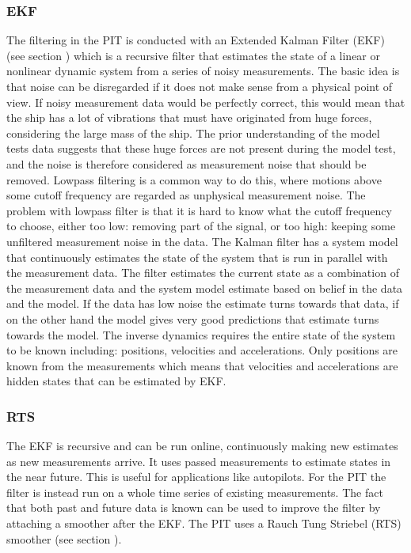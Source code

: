 \documentclass[review]{elsarticle}
\begin{document}
\subsubsection{EKF}
\label{\detokenize{01.01_method:ekf}}
\sphinxAtStartPar
The filtering in the PIT is conducted with an Extended Kalman Filter (EKF) (see section {\hyperref[\detokenize{04.01_EK:ekf}]{}}) which is a recursive filter that estimates the state of a linear or nonlinear dynamic system from a series of noisy measurements. The basic idea is that noise can be disregarded if it does not make sense from a physical point of view. If noisy measurement data would be perfectly correct, this would mean that the ship has a lot of vibrations that must have originated from huge forces, considering the large mass of the ship. The prior understanding of the model tests data suggests that these huge forces are not present during the model test, and the noise is therefore considered as measurement noise that should be removed. Lowpass filtering is a common way to do this, where motions above some cut\sphinxhyphen{}off frequency are regarded as unphysical measurement noise. The problem with lowpass filter is that it is hard to know what the cut\sphinxhyphen{}off frequency to choose, either too low: removing part of the signal, or too high: keeping some unfiltered measurement noise in the data.
The Kalman filter has a system model that continuously estimates the state of the system that is run in parallel with the measurement data. The filter estimates the current state as a combination of the measurement data and the system model estimate based on belief in the data and the model. If the data has low noise the estimate turns towards that data, if on the other hand the model gives very good predictions that estimate turns towards the model. The inverse dynamics requires the entire state of the system to be known including: positions, velocities and accelerations. Only positions are known from the measurements which means that velocities and accelerations are hidden states that can be estimated by EKF.


\subsubsection{RTS}
\label{\detokenize{01.01_method:rts}}
\sphinxAtStartPar
The EKF is recursive and can be run online, continuously making new estimates as new measurements arrive. It uses passed measurements to estimate states in the near future. This is useful for applications like autopilots. For the PIT the filter is instead run on a whole time series of existing measurements. The fact that both past and future data is known can be used to improve the filter by attaching a smoother after the EKF.  The PIT uses a Rauch Tung Striebel (RTS) smoother (see section {\hyperref[\detokenize{04.01_EK:rts}]{}}).
\end{document}
